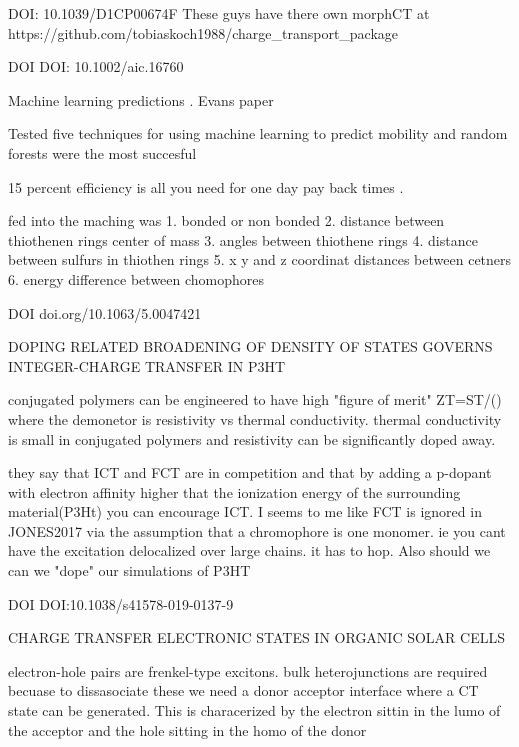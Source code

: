 

DOI: 10.1039/D1CP00674F
    These guys have there own morphCT at https://github.com/tobiaskoch1988/charge_transport_package

DOI DOI: 10.1002/aic.16760

    Machine learning predictions . Evans paper

    Tested five techniques for using machine learning to predict mobility and random forests were the most succesful

    15 percent efficiency is all you need for one day pay back times .

    fed into the maching was 1. bonded or non bonded
                                2. distance between thiothenen rings center of mass
                                3. angles between thiothene rings
                                4. distance between sulfurs in thiothen rings
                                5. x y and z coordinat distances between cetners
                                6. energy difference between chomophores


DOI doi.org/10.1063/5.0047421 

    DOPING RELATED BROADENING OF DENSITY OF STATES GOVERNS INTEGER-CHARGE TRANSFER IN P3HT
    
    conjugated polymers can be engineered to have high "figure of merit" ZT=ST/(\rho*\kappa) where the demonetor 
    is resistivity vs thermal conductivity. thermal conductivity is small in conjugated polymers and resistivity can be 
    significantly doped away. 

    they say that ICT and FCT are in competition and that by adding a p-dopant with electron affinity higher that the
    ionization energy of the surrounding material(P3Ht) you can encourage ICT. I seems to me like FCT is ignored in JONES2017
    via the assumption that a chromophore is one monomer. ie you cant have the excitation delocalized over large chains. it has to hop. 
    Also should we  can we "dope" our simulations of P3HT

DOI DOI:10.1038/s41578-019-0137-9

CHARGE TRANSFER ELECTRONIC STATES IN ORGANIC SOLAR CELLS

    electron-hole pairs are frenkel-type excitons. bulk heterojunctions are required becuase to dissasociate these we need a
    donor acceptor interface where a CT state can be generated. This is characerized by the electron sittin in the lumo of the 
    acceptor and the hole sitting in the homo of the donor

